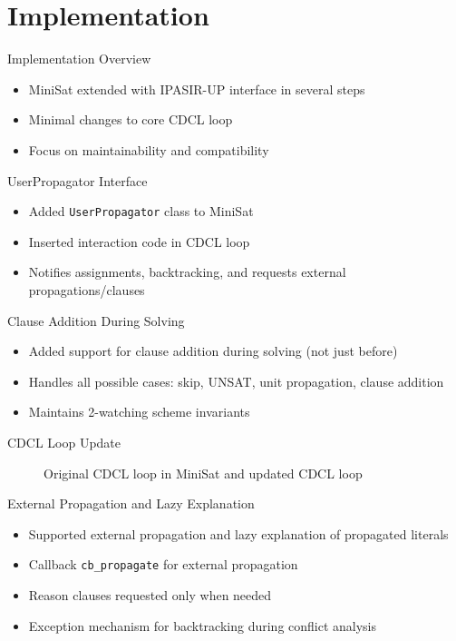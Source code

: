 \documentclass{beamer}
\newcommand*{\code}[1]{\lstinline[basicstyle=\ttfamily, breaklines]|#1|}
\begin{document}
\section{Implementation}

\begin{frame}{Implementation Overview}
  \begin{itemize}
    \item MiniSat extended with IPASIR-UP interface in several steps
    \item Minimal changes to core CDCL loop
    \item Focus on maintainability and compatibility
  \end{itemize}
\end{frame}

\begin{frame}{UserPropagator Interface}
  \begin{itemize}
    \item Added \code{UserPropagator} class to MiniSat
    \item Inserted interaction code in CDCL loop
    \item Notifies assignments, backtracking, and requests external propagations/clauses
  \end{itemize}
\end{frame}

\begin{frame}{Clause Addition During Solving}
  \begin{itemize}
    \item Added support for clause addition during solving (not just before)
    \item Handles all possible cases: skip, UNSAT, unit propagation, clause addition
    \item Maintains 2-watching scheme invariants
  \end{itemize}
\end{frame}

\begin{frame}{CDCL Loop Update}
  \begin{figure}
    \centering
    
    \caption{Original CDCL loop in MiniSat and updated CDCL loop}
  \end{figure}
\end{frame}

\begin{frame}{External Propagation and Lazy Explanation}
  \begin{itemize}
    \item Supported external propagation and lazy explanation of propagated literals
    \item Callback \code{cb_propagate} for external propagation
    \item Reason clauses requested only when needed
    \item Exception mechanism for backtracking during conflict analysis
  \end{itemize}
\end{frame}
\end{document}
